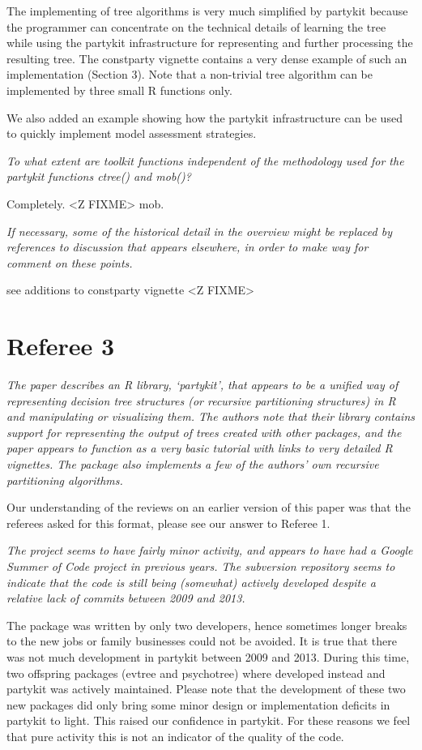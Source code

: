 \documentclass{article}
\begin{document}
The implementing of tree algorithms is very much simplified by partykit
because the programmer can concentrate on the technical details of learning
the tree while using the partykit infrastructure for representing and
further processing the resulting tree. The constparty vignette contains a
very dense example of such an implementation (Section 3). Note that a
non-trivial tree algorithm can be implemented by three small R functions
only.

We also added an example showing how the partykit infrastructure can be used
to quickly implement model assessment strategies.

\textit{To what extent are toolkit functions independent of
the methodology used for the partykit functions ctree() and mob()?}

Completely. <Z FIXME> mob.

\textit{If necessary, some of the historical detail in the overview might be replaced
by references to discussion that appears elsewhere, in order to make way for
comment on these points.}

see additions to constparty vignette
<Z FIXME>

\section*{Referee 3}

\textit{
The paper describes an R library, `partykit', that appears to be a unified
way of representing decision tree structures (or recursive partitioning
structures) in R and manipulating or visualizing them.  The authors note
that their library contains support for representing the output of trees
created with other packages, and the paper appears to function as a very
basic tutorial with links to very detailed R vignettes.  The package also
implements a few of the authors' own recursive partitioning algorithms.}

Our understanding of the reviews on an earlier version of this paper was
that the referees asked for this format, please see our answer to Referee 1.

\textit{
The project seems to have fairly minor activity, and appears to have had a
Google Summer of Code project in previous years.  The subversion repository
seems to indicate that the code is still being (somewhat) actively developed
despite a relative lack of commits between 2009 and 2013.}

The package was written by only two developers, hence sometimes longer
breaks to the new jobs or family businesses could not be avoided.
It is true that there was not much development in partykit between 2009 and
2013. During this time, two offspring packages (evtree and psychotree) where
developed instead and partykit was actively maintained. Please note that the
development of these two new packages did only bring some minor design or
implementation deficits in partykit to light. This raised our confidence in
partykit. For these reasons we feel that pure activity this is not an indicator of 
the quality of the code.
\end{document}
